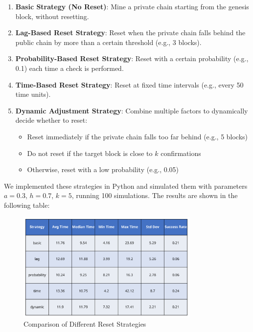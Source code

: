 \documentclass[12pt,a4paper]{article}
\begin{document}
\begin{enumerate}
    \item \textbf{Basic Strategy (No Reset)}: Mine a private chain starting from the genesis block, without resetting.
    \item \textbf{Lag-Based Reset Strategy}: Reset when the private chain falls behind the public chain by more than a certain threshold (e.g., 3 blocks).
    \item \textbf{Probability-Based Reset Strategy}: Reset with a certain probability (e.g., 0.1) each time a check is performed.
    \item \textbf{Time-Based Reset Strategy}: Reset at fixed time intervals (e.g., every 50 time units).
    \item \textbf{Dynamic Adjustment Strategy}: Combine multiple factors to dynamically decide whether to reset:
        \begin{itemize}
            \item Reset immediately if the private chain falls too far behind (e.g., 5 blocks)
            \item Do not reset if the target block is close to $k$ confirmations
            \item Otherwise, reset with a low probability (e.g., 0.05)
        \end{itemize}
\end{enumerate}

We implemented these strategies in Python and simulated them with parameters $a = 0.3$, $h = 0.7$, $k = 5$, running 100 simulations. The results are shown in the following table:

\begin{figure}[h]
    \centering
    \includegraphics[width=0.8\textwidth]{images/reset_strategy_table.png}
    \caption{Comparison of Different Reset Strategies}
\end{figure}
\end{document}
